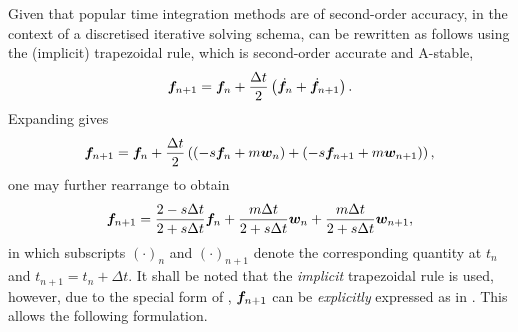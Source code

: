 Given that popular time integration methods are of second-order accuracy, in the context of a discretised iterative solving schema,  can be rewritten as follows using the (implicit) trapezoidal rule, which is second-order accurate and A-stable,
\begin{gather}
\bm{f}_{n+1}=\bm{f}_n+\dfrac{\Delta{}t}{2}\left(\dot{\bm{f}}_n+\dot{\bm{f}}_{n+1}\right).
\end{gather}
Expanding gives
\begin{gather}
\bm{f}_{n+1}=\bm{f}_n+\dfrac{\Delta{}t}{2}\left(\left(-s\bm{f}_{n}+m\bm{w}_{n}\right)+\left(-s\bm{f}_{n+1}+m\bm{w}_{n+1}\right)\right),
\end{gather}
one may further rearrange to obtain
\begin{gather}\label{eq:discretised_c}
\bm{f}_{n+1}=\dfrac{2-s\Delta{}t}{2+s\Delta{}t}\bm{f}_n+\dfrac{m\Delta{}t}{2+s\Delta{}t}\bm{w}_n+\dfrac{m\Delta{}t}{2+s\Delta{}t}\bm{w}_{n+1},
\end{gather}
in which subscripts $\left(\cdot\right)_n$ and $\left(\cdot\right)_{n+1}$ denote the corresponding quantity at $t_n$ and $t_{n+1}=t_n+\Delta{}t$.
It shall be noted that the \textit{implicit} trapezoidal rule is used, however, due to the special form of , $\bm{f}_{n+1}$ can be \textit{explicitly} expressed as in . This allows the following formulation.

